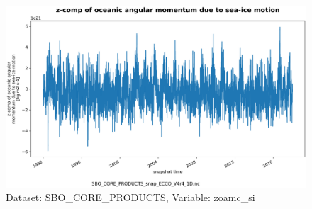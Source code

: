 \begin{figure}[H]
\centering
\includegraphics[scale=0.55]{../images/plots/oneD_plots/SBO_Core_Products/zoamc_si.png}
\caption{Dataset: SBO\_CORE\_PRODUCTS, Variable: zoamc\_si}
\label{tab:table-SBO_CORE_PRODUCTS_zoamc_si-Plot}
\end{figure}
\newpage
\pagebreak
